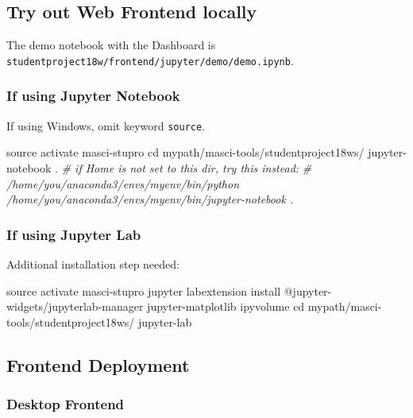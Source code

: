 \documentclass[]{article}
\newenvironment{Shaded}{}{}
\newcommand{\CommentTok}[1]{\textcolor[rgb]{0.38,0.63,0.69}{\textit{#1}}}
\newcommand{\BuiltInTok}[1]{#1}
\newcommand{\ExtensionTok}[1]{#1}
\newcommand{\NormalTok}[1]{#1}
\begin{document}
\subsection{Try out Web Frontend
locally}\label{try-out-web-frontend-locally}

The demo notebook with the Dashboard is
\texttt{studentproject18w/frontend/jupyter/demo/demo.ipynb}.

\subsubsection{If using Jupyter
Notebook}\label{if-using-jupyter-notebook}

If using Windows, omit keyword \texttt{source}.

\begin{Shaded}
\begin{Highlighting}[]
\BuiltInTok{source}\NormalTok{ activate masci-stupro}
\BuiltInTok{cd}\NormalTok{ mypath/masci-tools/studentproject18ws/}
\ExtensionTok{jupyter-notebook}\NormalTok{ .}
\CommentTok{# if Home is not set to this dir, try this instead:}
\CommentTok{# /home/you/anaconda3/envs/myenv/bin/python /home/you/anaconda3/envs/myenv/bin/jupyter-notebook .}
\end{Highlighting}
\end{Shaded}

\subsubsection{If using Jupyter Lab}\label{if-using-jupyter-lab}

Additional installation step needed:

\begin{Shaded}
\begin{Highlighting}[]
\BuiltInTok{source}\NormalTok{ activate masci-stupro}
\ExtensionTok{jupyter}\NormalTok{ labextension install @jupyter-widgets/jupyterlab-manager jupyter-matplotlib ipyvolume}
\BuiltInTok{cd}\NormalTok{ mypath/masci-tools/studentproject18ws/}
\ExtensionTok{jupyter-lab}
\end{Highlighting}
\end{Shaded}

\subsection{Frontend Deployment}\label{frontend-deployment}

\subsubsection{Desktop Frontend}\label{desktop-frontend-1}
\end{document}
